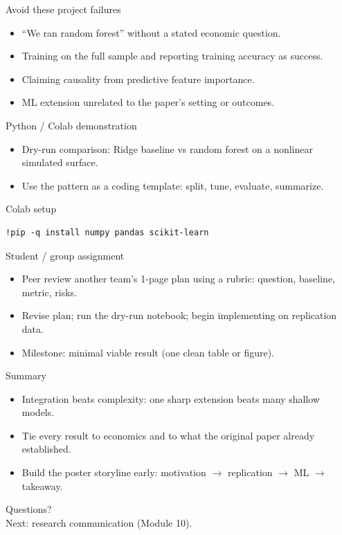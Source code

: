 \documentclass[aspectratio=169,11pt]{beamer}
\begin{document}
\begin{frame}{Avoid these project failures}
  \begin{itemize}
    \item ``We ran random forest'' without a stated economic question.
    \item Training on the full sample and reporting training accuracy as success.
    \item Claiming causality from predictive feature importance.
    \item ML extension unrelated to the paper’s setting or outcomes.
  \end{itemize}
\end{frame}

\begin{frame}{Python / Colab demonstration}
  \begin{itemize}
    \item Dry-run comparison: Ridge baseline vs random forest on a nonlinear simulated surface.
    \item Use the pattern as a coding template: split, tune, evaluate, summarize.
  \end{itemize}
\end{frame}

\begin{frame}[fragile]{Colab setup}
  \begin{verbatim}
!pip -q install numpy pandas scikit-learn
  \end{verbatim}
\end{frame}

\begin{frame}{Student / group assignment}
  \begin{itemize}
    \item Peer review another team’s 1-page plan using a rubric: question, baseline, metric, risks.
    \item Revise plan; run the dry-run notebook; begin implementing on replication data.
    \item Milestone: minimal viable result (one clean table or figure).
  \end{itemize}
\end{frame}

\begin{frame}{Summary}
  \begin{itemize}
    \item Integration beats complexity: one sharp extension beats many shallow models.
    \item Tie every result to economics and to what the original paper already established.
    \item Build the poster storyline early: motivation \(\rightarrow\) replication \(\rightarrow\) ML \(\rightarrow\) takeaway.
  \end{itemize}
\end{frame}

\begin{frame}[plain]
  \begin{center}
    \Large Questions?\\[0.8em]
    \normalsize Next: research communication (Module 10).
  \end{center}
\end{frame}
\end{document}

